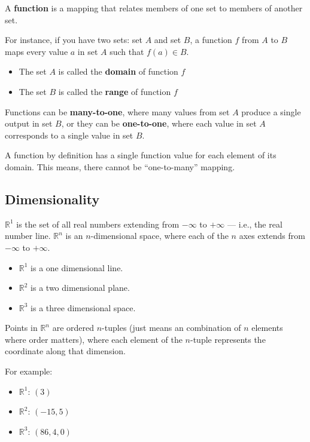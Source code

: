 \documentclass[
  letterpaper,
]{book}
\providecommand{\tightlist}{%
  \setlength{\itemsep}{0pt}\setlength{\parskip}{0pt}}\usepackage{longtable,booktabs,array}
\theoremstyle{definition}
\theoremstyle{definition}
\theoremstyle{plain}
\theoremstyle{definition}
\theoremstyle{plain}
\theoremstyle{plain}
\theoremstyle{remark}
\begin{document}
A \textbf{function} is a mapping that relates members of one set to
members of another set.

For instance, if you have two sets: set \(A\) and set \(B\), a function
\(f\) from \(A\) to \(B\) maps every value \(a\) in set \(A\) such that
\(f(a) \in B\).

\begin{itemize}
\tightlist
\item
  The set \(A\) is called the \textbf{domain} of function \(f\)
\item
  The set \(B\) is called the \textbf{range} of function \(f\)
\end{itemize}

Functions can be \textbf{many-to-one}, where many values from set \(A\)
produce a single output in set \(B\), or they can be
\textbf{one-to-one}, where each value in set \(A\) corresponds to a
single value in set \(B\).

A function by definition has a single function value for each element of
its domain. This means, there cannot be ``one-to-many'' mapping.

\hypertarget{dimensionality}{%
\subsection*{Dimensionality}\label{dimensionality}}

\(\mathbb{R}^1\) is the set of all real numbers extending from
\(-\infty\) to \(+\infty\) --- i.e., the real number line.
\(\mathbb{R}^n\) is an \(n\)-dimensional space, where each of the \(n\)
axes extends from \(-\infty\) to \(+\infty\).

\begin{itemize}
\tightlist
\item
  \(\mathbb{R}^1\) is a one dimensional line.
\item
  \(\mathbb{R}^2\) is a two dimensional plane.
\item
  \(\mathbb{R}^3\) is a three dimensional space.
\end{itemize}

Points in \(\mathbb{R}^n\) are ordered \(n\)-tuples (just means an
combination of \(n\) elements where order matters), where each element
of the \(n\)-tuple represents the coordinate along that dimension.

For example:

\begin{itemize}
\tightlist
\item
  \(\mathbb{R}^1\): \((3)\)
\item
  \(\mathbb{R}^2\): \((-15, 5)\)
\item
  \(\mathbb{R}^3\): \((86, 4, 0)\)
\end{itemize}
\end{document}

